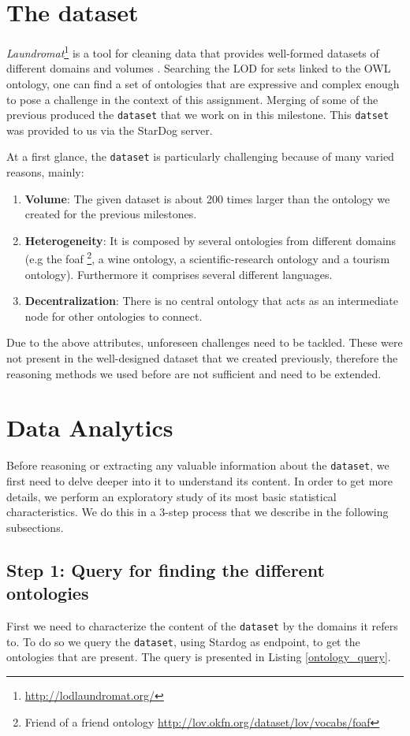 \documentclass[runningheads,a4paper]{../../StyleFiles/llncs}
\begin{document}
\section{The dataset}
\textit{Laundromat}\footnote{\url{http://lodlaundromat.org/}} is a tool for cleaning data that provides well-formed datasets of different domains and volumes \cite{beek2014lod}. Searching the LOD for sets linked to the OWL ontology, one can find a set of ontologies that are expressive and complex enough to pose a challenge in the context of this assignment. Merging of some of the previous produced the \texttt{dataset} that we work on in this milestone. This \texttt{datset} was provided to us via the StarDog server. 

At a first glance, the \texttt{dataset} is particularly challenging because of many varied reasons, mainly:

\begin{enumerate}
	\item \textbf{Volume}: The given dataset is about 200 times larger than the ontology we created for the previous milestones.
	\item \textbf{Heterogeneity}: It is composed by several ontologies from different domains (e.g the foaf \footnote{Friend of a friend ontology \url{http://lov.okfn.org/dataset/lov/vocabs/foaf}}, a wine ontology, a scientific-research ontology and a tourism ontology). Furthermore it comprises several different languages.
	\item \textbf{Decentralization}: There is no central ontology that acts as an intermediate node for other ontologies to connect.
\end{enumerate}

Due to the above attributes, unforeseen challenges need to be tackled. These were not present in the well-designed dataset that we created previously, therefore the reasoning methods we used before are not sufficient and need to be extended.

\section{Data Analytics}
Before reasoning or extracting any valuable information about the \texttt{dataset}, we first need to delve deeper into it to understand its content. In order to get more details, we perform an exploratory study of its most basic statistical characteristics. We do this in a 3-step process that we describe in the following subsections.

\subsection{Step 1: Query for finding the different ontologies}
First we need to characterize the content of the \texttt{dataset} by the domains it refers to. To do so we query the \texttt{dataset}, using Stardog as endpoint, to get the ontologies that are present. The query is presented in Listing \ref{ontology_query}.
\end{document}
